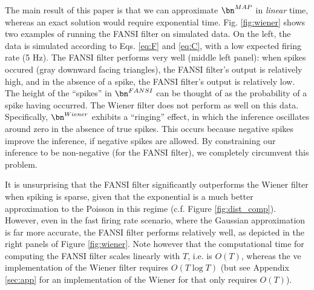 The main result of this paper is that we can approximate $\bn^{MAP}$ in \emph{linear} time, whereas an exact solution would require exponential time. Fig. \ref{fig:wiener} shows two examples of running the FANSI filter on simulated data.  On the left, the data is simulated according to Eqs. \eqref{eq:F} and \eqref{eq:C}, with a low expected firing rate (5 Hz).  The FANSI filter performs very well (middle left panel): when spikes occured (gray downward facing triangles), the FANSI filter's output is relatively high, and in the absence of a spike, the FANSI filter's output is relatively low. The height of the ``spikes'' in $\bn^{FANSI}$ can be thought of as the probability of a spike having occurred.  The Wiener filter does not perform as well on this data.  Specifically, $\bn^{Wiener}$ exhibits a ``ringing'' effect, in which the inference oscillates around zero in the absence of true spikes.  This occurs because negative spikes improve the inference, if negative spikes are allowed.  By constraining our inference to be non-negative (for the FANSI filter), we completely circumvent this problem.  

It is unsurprising that the FANSI filter significantly outperforms the Wiener filter when spiking is sparse, given that the exponential is a much better approximation to the Poisson in this regime (c.f. Figure \ref{fig:dist_comp}).  However, even in the fast firing rate scenario, where the Gaussian approximation is far more accurate, the FANSI filter performs relatively well, as depicted in the right panels of Figure \ref{fig:wiener}.  Note however that the computational time for computing the FANSI filter scales linearly with $T$, i.e. is $O(T)$, whereas the \nai ve implementation of the Wiener filter requires $O(T \log T)$ (but see Appendix \ref{sec:app} for an implementation of the Wiener for that only requires $O(T)$).  


